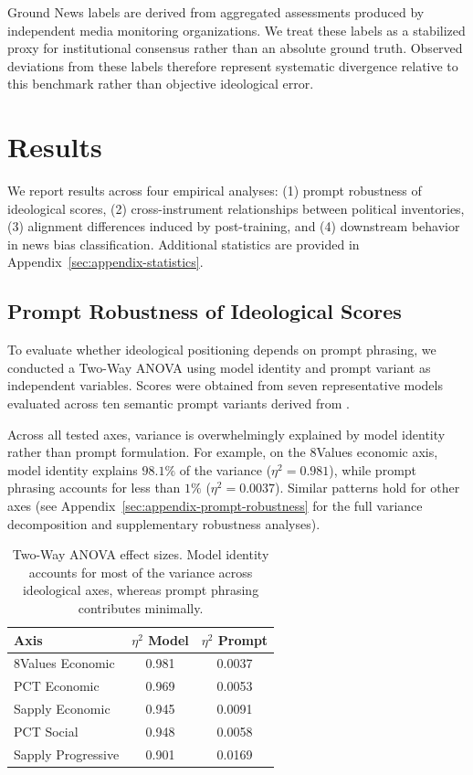 \documentclass[11pt]{article}
\begin{document}
Ground News labels are derived from aggregated assessments produced by independent media monitoring organizations. We treat these labels as a stabilized proxy for institutional consensus rather than an absolute ground truth. Observed deviations from these labels therefore represent systematic divergence relative to this benchmark rather than objective ideological error.




\section{Results}
\label{sec:results}

We report results across four empirical analyses: (1) prompt robustness of ideological scores, (2) cross-instrument relationships between political inventories, (3) alignment differences induced by post-training, and (4) downstream behavior in news bias classification. Additional statistics are provided in Appendix~\ref{sec:appendix-statistics}.

\subsection{Prompt Robustness of Ideological Scores}

To evaluate whether ideological positioning depends on prompt phrasing, we conducted a Two-Way ANOVA using model identity and prompt variant as independent variables. Scores were obtained from seven representative models evaluated across ten semantic prompt variants derived from \citet{rottger-etal-2024-political}.

Across all tested axes, variance is overwhelmingly explained by model identity rather than prompt formulation. For example, on the 8Values economic axis, model identity explains $98.1\%$ of the variance ($\eta^2=0.981$), while prompt phrasing accounts for less than $1\%$ ($\eta^2=0.0037$). Similar patterns hold for other axes (see Appendix~\ref{sec:appendix-prompt-robustness} for the full variance decomposition and supplementary robustness analyses).

\begin{table}[t]
\centering
\small
\begin{tabular}{l c c}
\toprule
\textbf{Axis }& \textbf{$\eta^2$ Model} & \textbf{$\eta^2$ Prompt} \\
\midrule
8Values Economic & 0.981 & 0.0037 \\
PCT Economic & 0.969 & 0.0053 \\
Sapply Economic & 0.945 & 0.0091 \\
PCT Social & 0.948 & 0.0058 \\
Sapply Progressive & 0.901 & 0.0169 \\
\bottomrule
\end{tabular}
\caption{Two-Way ANOVA effect sizes. Model identity accounts for most of the variance across ideological axes, whereas prompt phrasing contributes minimally.}
\vspace{-5mm}
\label{tab:anova_prompt_summary}
\end{table}
\end{document}
